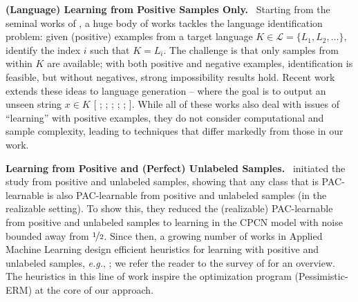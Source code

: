 \documentclass[11pt]{article}
\newcommand{\plaincite}[1]{%
  \begingroup
    \renewcommand*{\bibopenbracket}{}%
    \renewcommand*{\bibclosebracket}{}%
    \cite{#1}%
  \endgroup
}
\theoremstyle{plain}
\theoremstyle{definition}
\theoremstyle{remark}
\newcommand{\nfrac}[2]{\nicefrac{#1}{#2}}
\renewcommand{\paragraph}[1]{\medskip \noindent\textbf{#1}~}
\newcommand{\eg}{\textit{e.g.}}
\newcommand{\pERM}{Pessimistic-ERM}
\begin{document}
         \paragraph{{(Language) Learning from Positive Samples Only.}} 
         Starting from the seminal works of \citet{gold1967language,angluin1979finding,angluin1988learning}, a huge body of works tackles the language identification problem: given (positive) examples from a target language $K \in \mathcal{L} = \{L_1, L_2, \dots\}$, identify the index $i$ such that $K = L_i$. The challenge is that only samples from within $K$ are available; with both positive and negative examples, identification is feasible, but without negatives, strong impossibility results hold. Recent work extends these ideas to language generation -- where the goal is to output an unseen string $x\in K$  
        [\plaincite{kleinberg2024language}; \plaincite{li2024generationlenslearningtheory}; \plaincite{kalavasis2025limitslanguagegenerationtradeoffs}; \plaincite{charikar2024exploringfacetslanguagegenerationV2}; \plaincite{kalavasis2024characterizationslanguagegenerationbreadth}; \plaincite{raman2025generationnoisyexamples}].
        While all of these works also deal with issues of ``learning'' with positive examples, they do not consider computational and sample complexity, leading to techniques that differ markedly from those in our work.
            
        \paragraph{Learning from Positive and (Perfect) Unlabeled Samples.} 
        \citet{denis1990positive} initiated the study from positive and unlabeled samples, showing that any class that is PAC-learnable is also PAC-learnable from positive and unlabeled samples (in the realizable setting). To show this, they reduced the (realizable) PAC-learnable from positive and unlabeled samples to learning in the CPCN model with noise bounded away from $\nfrac{1}{2}$.
       Since then, a growing number of works in Applied Machine Learning design efficient heuristics for learning with positive and unlabeled samples, \eg{}, \cite{elkan2008pu,mordelet2011prodige,plessis15convex,sakai2019covariate, bekker2020learning,reviewPUBioformatics2021}; we refer the reader to the survey of \citet{bekker2020learning} for an overview. 
        The heuristics in this line of work inspire the optimization program (\pERM{}) at the core of our approach.
 
\end{document}
